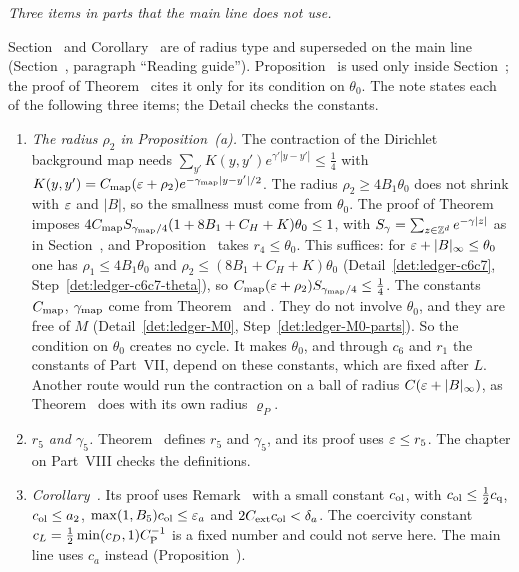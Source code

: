 \begin{detail}\label{det:ledger-off}
\emph{Three items in parts that the main line does not use.}

Section~ and Corollary~ are of radius type and superseded on the main line (Section~, paragraph ``Reading guide''). Proposition~ is used only inside Section~; the proof of Theorem~ cites it only for its condition on $\theta_0$. The note states each of the following three items; the Detail checks the constants.

\begin{enumerate}[label=(\roman*)]
\item \emph{The radius $\rho_2$ in Proposition~(a).} The contraction of the Dirichlet background map needs $\sum_{y'}K(y,y')e^{\gamma'|y-y'|}\le\frac14$ with $K(y,y')=C_{\rm map}(\varepsilon+\rho_2)e^{-\gamma_{\rm map}|y-y'|/2}$. The radius $\rho_2\ge4B_1\theta_0$ does not shrink with $\varepsilon$ and $|B|$, so the smallness must come from $\theta_0$. The proof of Theorem~ imposes $4C_{\rm map}S_{\gamma_{\rm map}/4}(1+8B_1+C_H+K)\theta_0\le1$, with $S_\gamma=\sum_{z\in\mathbb Z^d}e^{-\gamma|z|}$ as in Section~, and Proposition~ takes $r_4\le\theta_0$. This suffices: for $\varepsilon+|B|_\infty\le\theta_0$ one has $\rho_1\le4B_1\theta_0$ and $\rho_2\le(8B_1+C_H+K)\theta_0$ (Detail~\ref{det:ledger-c6c7}, Step~\ref{det:ledger-c6c7-theta}), so $C_{\rm map}(\varepsilon+\rho_2)S_{\gamma_{\rm map}/4}\le\frac14$. The constants $C_{\rm map}$, $\gamma_{\rm map}$ come from Theorem~ and . They do not involve $\theta_0$, and they are free of $M$ (Detail~\ref{det:ledger-M0}, Step~\ref{det:ledger-M0-parts}). So the condition on $\theta_0$ creates no cycle. It makes $\theta_0$, and through $c_6$ and $r_1$ the constants of Part~VII, depend on these constants, which are fixed after $L$. Another route would run the contraction on a ball of radius $C(\varepsilon+|B|_\infty)$, as Theorem~ does with its own radius $\varrho_P$.
\item \emph{$r_5$ and $\gamma_5$.} Theorem~ defines $r_5$ and $\gamma_5$, and its proof uses $\varepsilon\le r_5$. The chapter on Part~VIII checks the definitions.
\item \emph{Corollary~.} Its proof uses Remark~ with a small constant $c_{\rm ol}$, with $c_{\rm ol}\le\frac12c_{\rm q}$, $c_{\rm ol}\le a_2$, $\max(1,B_5)c_{\rm ol}\le\varepsilon_a$ and $2C_{\rm ext}c_{\rm ol}<\delta_a$. The coercivity constant $c_L=\frac12\min(c_D,1)C_{\rm P}^{-1}$ is a fixed number and could not serve here. The main line uses $c_a$ instead (Proposition~).
\end{enumerate}
\end{detail}

